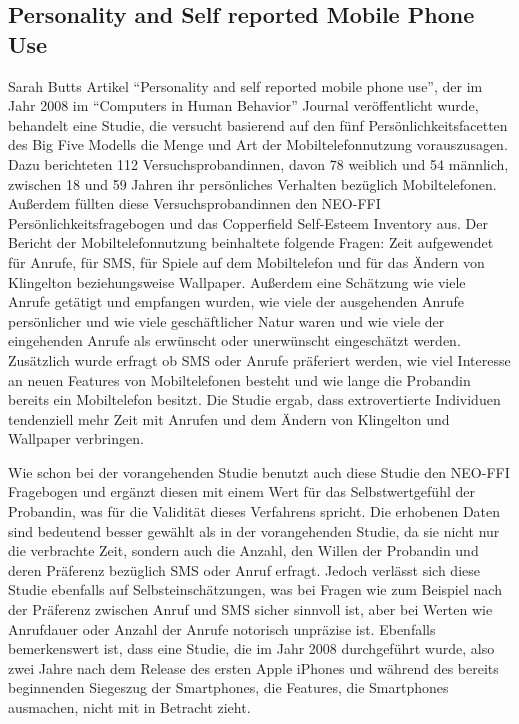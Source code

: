 \subsection*{Personality and Self reported Mobile Phone Use}

Sarah Butts Artikel "`Personality and self reported mobile phone use"', der im Jahr 2008 im "`Computers in Human Behavior"' Journal veröffentlicht wurde,
behandelt eine Studie, die versucht basierend auf den fünf Persönlichkeitsfacetten des Big Five Modells die Menge und Art der Mobiltelefonnutzung vorauszusagen.
Dazu berichteten 112 Versuchsprobandinnen, davon 78 weiblich und 54 männlich, zwischen 18 und 59 Jahren ihr persönliches Verhalten bezüglich Mobiltelefonen.
Außerdem füllten diese Versuchsprobandinnen den NEO-FFI Persönlichkeitsfragebogen und das Copperfield Self-Esteem Inventory aus.
Der Bericht der Mobiltelefonnutzung beinhaltete folgende Fragen: Zeit aufgewendet für Anrufe, für SMS, für Spiele auf dem Mobiltelefon und für das Ändern von Klingelton beziehungsweise Wallpaper.
Außerdem eine Schätzung wie viele Anrufe getätigt und empfangen wurden, wie viele der ausgehenden Anrufe persönlicher und wie viele geschäftlicher Natur waren und wie viele der eingehenden Anrufe als erwünscht oder unerwünscht eingeschätzt werden.
Zusätzlich wurde erfragt ob SMS oder Anrufe präferiert werden, wie viel Interesse an neuen Features von Mobiltelefonen besteht und wie lange die Probandin bereits ein Mobiltelefon besitzt.
Die Studie ergab, dass extrovertierte Individuen tendenziell mehr Zeit mit Anrufen und dem Ändern von Klingelton und Wallpaper verbringen.
\par
Wie schon bei der vorangehenden Studie benutzt auch diese Studie den NEO-FFI Fragebogen und ergänzt diesen mit einem Wert für das Selbstwertgefühl der Probandin, was für die Validität dieses Verfahrens spricht.
Die erhobenen Daten sind bedeutend besser gewählt als in der vorangehenden Studie, da sie nicht nur die verbrachte Zeit, sondern auch die Anzahl, den Willen der Probandin und deren Präferenz bezüglich SMS oder Anruf erfragt.
Jedoch verlässt sich diese Studie ebenfalls auf Selbsteinschätzungen, was bei Fragen wie zum Beispiel nach der Präferenz zwischen Anruf und SMS sicher sinnvoll ist, aber bei Werten wie Anrufdauer oder Anzahl der Anrufe notorisch unpräzise ist.
Ebenfalls bemerkenswert ist, dass eine Studie, die im Jahr 2008 durchgeführt wurde, also zwei Jahre nach dem Release des ersten Apple iPhones und während des bereits beginnenden Siegeszug der Smartphones, die Features, die Smartphones ausmachen, nicht mit in Betracht zieht.

